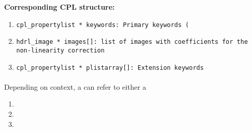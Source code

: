 \begin{datastructdef}
\textbf{Corresponding \ac{CPL} structure:}
\begin{enumerate}
    \item \texttt{cpl\_propertylist * keywords: Primary keywords (}
    \item \texttt{hdrl\_image * images[]: list of images with coefficients for the non-linearity correction}
    \item \texttt{cpl\_propertylist * plistarray[]: Extension keywords}
\end{enumerate}
\end{datastructdef}

\paragraph{}\label{dataitem:master_dark_det}
\label{dataitem:masterdark}
Depending on context, a  can refer to either a
\begin{enumerate}
\item {}
\item {}
\item {}
\end{enumerate}


